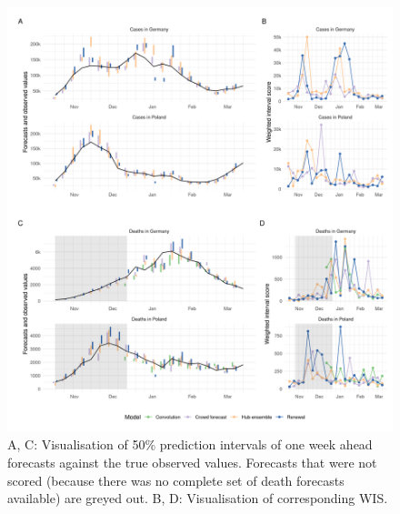 \documentclass[
]{article}
\begin{document}
\begin{figure}[H]
\includegraphics[width=1\linewidth,]{../analysis/plots/figure-forecasts-1} \caption{A, C: Visualisation of 50\% prediction intervals of one week ahead forecasts against the true observed values. Forecasts that were not scored (because there was no complete set of death forecasts available) are greyed out. B, D: Visualisation of corresponding WIS.}\label{fig:forecasts-and-truth-1}
\end{figure}
\end{document}
